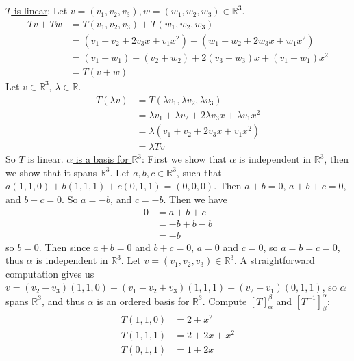\documentclass[11pt]{article}
\begin{document}
\renewcommand{\thesubsection}{\thesection.\alph{subsection}}


\section{} %
\underline{$T$ is linear}: Let $v=(v_1,v_2,v_3),w=(w_1,w_2,w_3)\in\mathbb{R}^3$.
\begin{align*}
	Tv+Tw&=T(v_1,v_2,v_3)+T(w_1,w_2,w_3)\\
	&=(v_1+v_2+2v_3x+v_1x^2)+(w_1+w_2+2w_3x+w_1x^2)\\
	&=(v_1+w_1)+(v_2+w_2)+2(v_3+w_3)x+(v_1+w_1)x^2\\
	&=T(v+w)
\end{align*}
Let $v\in\mathbb{R}^3$, $\lambda\in\mathbb{R}$.
\begin{align*}
	T(\lambda v)&=T(\lambda v_1,\lambda v_2,\lambda v_3)\\
	&=\lambda v_1+\lambda v_2+2\lambda v_3x+\lambda v_1x^2\\
	&=\lambda(v_1+v_2+2v_3x+v_1x^2)\\
	&=\lambda Tv
\end{align*}
So $T$ is linear.
\newline
\newline
\underline{$\alpha$ is a basis for $\mathbb{R}^3$}: First we show that
$\alpha$ is independent in $\mathbb{R}^3$, then we show that it spans
$\mathbb{R}^3$. Let $a,b,c\in\mathbb{R}^3$, such that
$a(1,1,0)+b(1,1,1)+c(0,1,1)=(0,0,0)$. Then $a+b=0$, $a+b+c=0$, and $b+c=0$. So
$a=-b$, and $c=-b$. Then we have
\begin{align*}
	0&=a+b+c\\
	&=-b+b-b\\
	&=-b
\end{align*}
so $b=0$. Then since $a+b=0$ and $b+c=0$, $a=0$ and $c=0$, so $a=b=c=0$, thus
$\alpha$ is independent in $\mathbb{R}^3$. Let
$v=(v_1,v_2,v_3)\in\mathbb{R}^3$. A straightforward computation gives us
$v=(v_2-v_3)(1,1,0)+(v_1-v_2+v_3)(1,1,1)+(v_2-v_1)(0,1,1)$, so $\alpha$ spans
$\mathbb{R}^3$, and thus $\alpha$ is an ordered basis for $\mathbb{R}^3$.
\newline
\newline
\underline{Compute $[T]_\alpha^\beta$ and $[T^{-1}]_\beta^\alpha$}:
\begin{align*}
	T(1,1,0)&=2+x^2\\
	T(1,1,1)&=2+2x+x^2\\
	T(0,1,1)&=1+2x\\\\
\end{align*}
\end{document}
